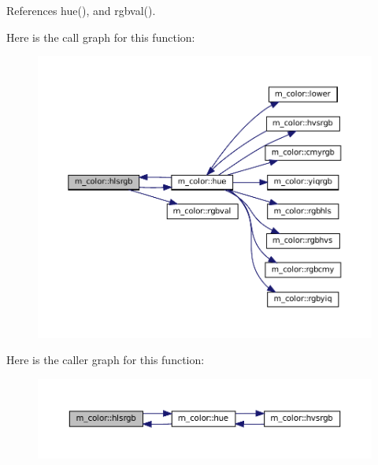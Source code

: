 References hue(), and rgbval().

Here is the call graph for this function\+:\nopagebreak
\begin{figure}[H]
\begin{center}
\leavevmode
\includegraphics[width=350pt]{namespacem__color_a40e6c91da216384eded2157cdaf86eba_cgraph}
\end{center}
\end{figure}
Here is the caller graph for this function\+:\nopagebreak
\begin{figure}[H]
\begin{center}
\leavevmode
\includegraphics[width=350pt]{namespacem__color_a40e6c91da216384eded2157cdaf86eba_icgraph}
\end{center}
\end{figure}
\mbox{\label{namespacem__color_a56dd07bbf1378ccc78a230d171f9d429}} 

